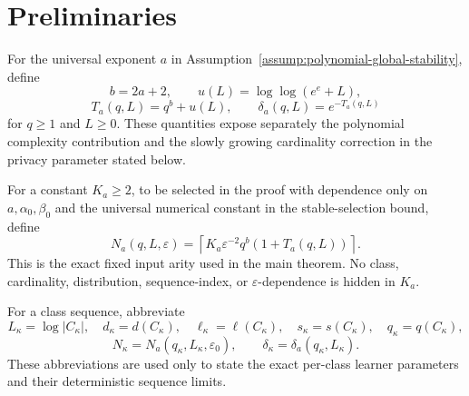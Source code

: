 \section{Preliminaries}\label{sec:prelim}

For the universal exponent \(a\) in
Assumption~\ref{assump:polynomial-global-stability}, define
\[
b=2a+2,\qquad
u(L)=\log\log(e^e+L),
\]
\[
T_a(q,L)=q^b+u(L),\qquad
\delta_a(q,L)=e^{-T_a(q,L)}
\]
for \(q\geq1\) and \(L\geq0\).  These quantities expose separately
the polynomial complexity contribution and the slowly growing
cardinality correction in the privacy parameter stated below.

For a constant \(K_a\geq2\), to be selected in the proof with
dependence only on \(a,\alpha_0,\beta_0\) and the universal numerical
constant in the stable-selection bound, define
\[
N_a(q,L,\varepsilon)
=
\left\lceil
K_a\varepsilon^{-2}q^b(1+T_a(q,L))
\right\rceil.
\]
This is the exact fixed input arity used in the main theorem.  No
class, cardinality, distribution, sequence-index, or
\(\varepsilon\)-dependence is hidden in \(K_a\).

For a class sequence, abbreviate
\[
L_\kappa=\log|C_\kappa|,\quad
d_\kappa=d(C_\kappa),\quad
\ell_\kappa=\ell(C_\kappa),\quad
s_\kappa=s(C_\kappa),\quad
q_\kappa=q(C_\kappa),
\]
\[
N_\kappa=N_a(q_\kappa,L_\kappa,\varepsilon_0),
\qquad
\delta_\kappa=\delta_a(q_\kappa,L_\kappa).
\]
These abbreviations are used only to state the exact per-class
learner parameters and their deterministic sequence limits.
